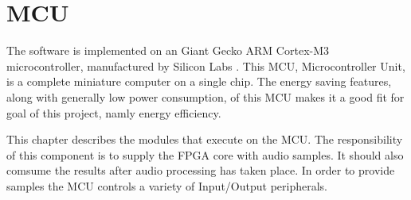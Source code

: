 \clearpage
\section{MCU} \label{section:mcu}

The software is implemented on an Giant Gecko ARM Cortex-M3 microcontroller, 
manufactured by Silicon Labs . 
This MCU, Microcontroller Unit, is a complete miniature computer on a single chip. 
The energy saving features, along with generally low power consumption, of this MCU 
makes it a good fit for goal of this project, namly energy efficiency. 

This chapter describes the modules that execute on the MCU. The responsibility 
of this component is to supply the FPGA core  with audio 
samples. It should also comsume the results after audio processing has taken 
place. In order to provide samples the MCU controls a variety of Input/Output 
peripherals. 







